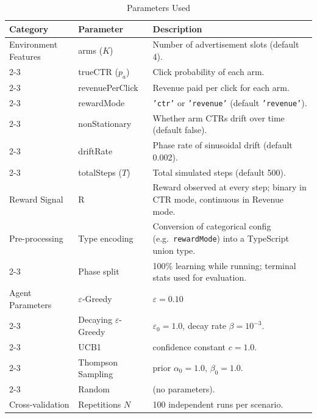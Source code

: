 \begin{table}[H]
\centering
\caption{Parameters Used}
\label{tab:params}
\renewcommand{\arraystretch}{1.25}
\begin{tabularx}{\linewidth}{|p{3.4cm}|p{4.0cm}|X|}
\hline
\rowcolor{tabhead}\textbf{Category} & \textbf{Parameter} & \textbf{Description}\\
\hline
Environment Features & arms ($K$)        & Number of advertisement slots (default 4).\\
\cline{2-3}
                     & trueCTR ($p_a$)   & Click probability of each arm.\\
\cline{2-3}
                     & revenuePerClick   & Revenue paid per click for each arm.\\
\cline{2-3}
                     & rewardMode        & \texttt{'ctr'} or \texttt{'revenue'} (default \texttt{'revenue'}).\\
\cline{2-3}
                     & nonStationary     & Whether arm CTRs drift over time (default false).\\
\cline{2-3}
                     & driftRate         & Phase rate of sinusoidal drift (default 0.002).\\
\cline{2-3}
                     & totalSteps ($T$)  & Total simulated steps (default 500).\\
\hline
Reward Signal        & R                 & Reward observed at every step; binary in CTR mode, continuous in Revenue mode.\\
\hline
Pre-processing       & Type encoding     & Conversion of categorical config (e.g.\ \texttt{rewardMode}) into a TypeScript union type.\\
\cline{2-3}
                     & Phase split       & 100\% learning while running; terminal stats used for evaluation.\\
\hline
Agent Parameters     & $\varepsilon$-Greedy   & $\varepsilon = 0.10$\\
\cline{2-3}
                     & Decaying $\varepsilon$-Greedy & $\varepsilon_0 = 1.0$, decay rate $\beta = 10^{-3}$.\\
\cline{2-3}
                     & UCB1              & confidence constant $c = 1.0$.\\
\cline{2-3}
                     & Thompson Sampling & prior $\alpha_0 = 1.0$, $\beta_0 = 1.0$.\\
\cline{2-3}
                     & Random            & (no parameters).\\
\hline
Cross-validation     & Repetitions $N$   & 100 independent runs per scenario.\\

\end{tabularx}
\end{table}
